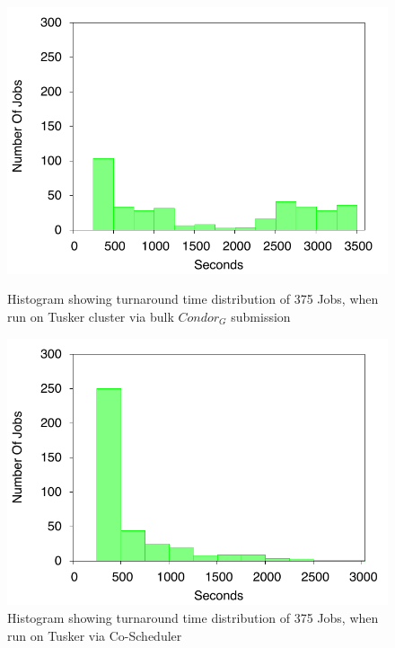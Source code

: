 \documentclass[ms,electronic,double]{nuthesis}
\begin{document}
\begin{figure}[h!]
\begin{center}
\includegraphics{images/tusker_histogram}
\caption{Histogram showing turnaround time distribution of 375 Jobs, when run on Tusker cluster via bulk $Condor_G$ submission}
\label{fig:tusker_histogram}
\end{center}

\begin{center}
\includegraphics{images/coscheduler_histogram}
\caption{Histogram showing turnaround time distribution of 375 Jobs, when run on Tusker  via Co-Scheduler}
\label{fig:coscheduler_histogram}
\end{center}


\end{figure}
\FloatBarrier
\end{document}
